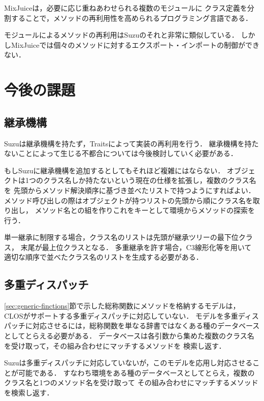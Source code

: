 \documentclass{ipsjprosym}
\begin{document}
MixJuice\cite{Ichisugi:2002}は，必要に応じ重ねあわせられる複数のモジュールに
クラス定義を分割することで，メソッドの再利用性を高められるプログラミング言語である．

モジュールによるメソッドの再利用はSuzuのそれと非常に類似している．
しかしMixJuiceでは個々のメソッドに対するエクスポート・インポートの制御ができない．

\section{今後の課題}

\subsection{継承機構}

Suzuは継承機構を持たず，Traitsによって実装の再利用を行う．
継承機構を持たないことによって生じる不都合については今後検討していく必要がある．

もしSuzuに継承機構を追加するとしてもそれほど複雑にはならない．
オブジェクトは1つのクラス名しか持たないという現在の仕様を拡張し，複数のクラス名を
先頭からメソッド解決順序に基づき並べたリストで持つようにすればよい．
メソッド呼び出しの際はオブジェクトが持つリストの先頭から順にクラス名を取り出し，
メソッド名との組を作りこれをキーとして環境からメソッドの探索を行う．

単一継承に制限する場合，クラス名のリストは先頭が継承ツリーの最下位クラス，
末尾が最上位クラスとなる．
多重継承を許す場合，C3線形化\cite{Barrett:1996:MSL:236337.236343}等を用いて
適切な順序で並べたクラス名のリストを生成する必要がある．

\subsection{多重ディスパッチ}
\label{sec:multiple-dispatch}

\ref{sec:generic-finctions}節で示した総称関数にメソッドを格納するモデルは，
CLOSがサポートする多重ディスパッチに対応していない．
モデルを多重ディスパッチに対応させるには，総称関数を単なる辞書ではなくある種のデータベース
としてとらえる必要がある．
データベースは各引数から集めた複数のクラス名を受け取って，その組み合わせにマッチするメソッドを
検索し返す．

Suzuは多重ディスパッチに対応していないが，このモデルを応用し対応させることが可能である．
すなわち環境をある種のデータベースとしてとらえ，複数のクラス名と1つのメソッド名を受け取って
その組み合わせにマッチするメソッドを検索し返す．
\end{document}
